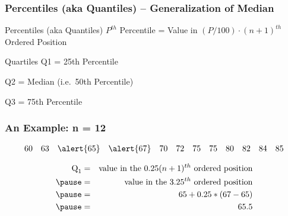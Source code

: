 \begin{frame}
\frametitle{Percentiles (aka Quantiles) -- Generalization of Median}
\begin{center} \end{center}
\vspace{1.5em}
\begin{block}{Percentiles (aka Quantiles)}
$P^{th}$ Percentile = Value in  $\left(P/100\right)\cdot (n+1)^{th}$ Ordered Position
\end{block}
\pause
\begin{block}{Quartiles}
Q1 = 25th Percentile

Q2 =  Median (i.e.\ 50th Percentile)

Q3 = 75th Percentile
\end{block}

\end{frame}


\begin{frame}
\frametitle{An Example: n = 12}
$$\begin{array}{cccccccccccc}
60&63&\alert{65}&\alert{67}&70&72&75&75&80&82&84&85
\end{array}$$

\begin{eqnarray*}\mbox{Q}_1 &=& \mbox{value in the } 0.25(n+1)^{th}\mbox{ ordered position}\\\pause
	&=& \mbox{value in the } 3.25^{th}\mbox{ ordered position}\\\pause
	&=& 65 + 0.25 * (67 - 65)\\\pause
	&=& 65.5
\end{eqnarray*}
\end{frame}


